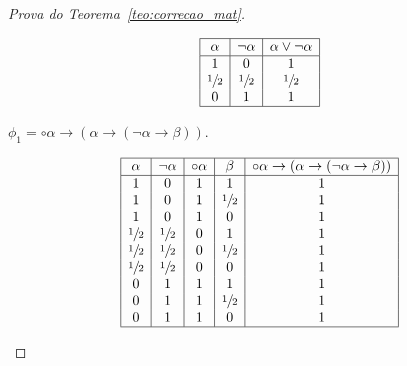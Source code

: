 \begin{proof}[Prova do Teorema~\ref{teo:correcao_mat}]
\begin{provaporcasos}
\begin{provaporsubcasos}
                \begin{center}
                    \[
                        \begin{array}{|c|c|c|}%
                            \hline
                            \alpha      & \neg \alpha & \alpha \lor \neg \alpha \\
                            \hline%
                            1 & 0 & 1\\
                            \meio{} & \meio{} & \meio{}\\
                            0 & 1 & 1\\
                            \hline
                        \end{array}
                    \]
                \end{center}
                
                 

                \subcasodeprova{} $\phi_{1} = \circ \alpha \to (\alpha \to (\neg \alpha \to \beta))$. 


                \begin{center}
                    \[
                        \begin{array}{|c|c|c|c|c|}%
                            \hline
                            \alpha      & \neg \alpha &\circ \alpha & \beta & \circ \alpha \to (\alpha \to (\neg \alpha \to \beta)) \\
                            \hline%
                            1 & 0 & 1 & 1 & 1 \\
                            1 & 0 & 1 & \meio{} & 1 \\
                            1 & 0 & 1 & 0 & 1 \\
                            \meio{} & \meio{} & 0 & 1 & 1 \\
                            \meio{} & \meio{} & 0 & \meio{} & 1 \\
                            \meio{} & \meio{} & 0 & 0 & 1 \\
                            0 & 1 & 1 & 1 & 1 \\
                            0 & 1 & 1 & \meio{} & 1 \\
                            0 & 1 & 1 & 0 & 1 \\
                            \hline
                        \end{array}
                    \]
                \end{center}
                

\end{provaporsubcasos}
\end{provaporcasos}
\end{proof}
